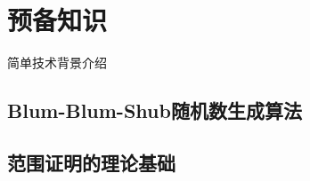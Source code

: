 \documentclass[zihao=-4]{ctexart}
\begin{document}

\section{预备知识}
简单技术背景介绍
\subsection*{Blum-Blum-Shub随机数生成算法}

\subsection{范围证明的理论基础}
\end{document}
